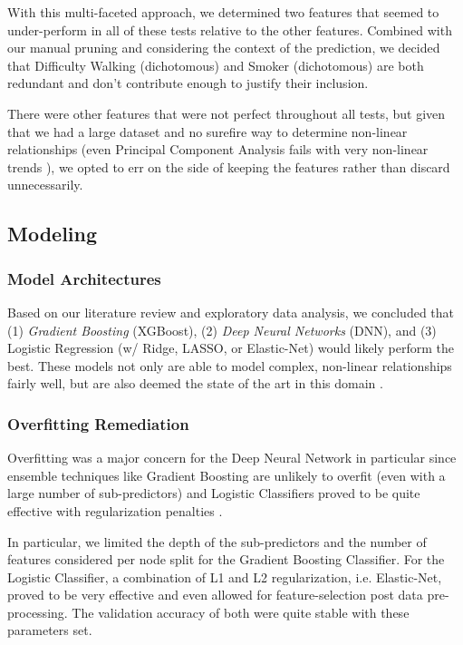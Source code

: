 \documentclass[conference]{IEEEtran}
\begin{document}
    With this multi-faceted approach, we determined two features that seemed to under-perform in all of these tests relative to the other features. Combined with our manual pruning and considering the context of the prediction, we decided that Difficulty Walking (dichotomous) and Smoker (dichotomous) are both redundant and don’t contribute enough to justify their inclusion.
    
    There were other features that were not perfect throughout all tests, but given that we had a large dataset and no surefire way to determine non-linear relationships (even Principal Component Analysis fails with very non-linear trends \cite{b5}), we opted to err on the side of keeping the features rather than discard unnecessarily.
    
    \subsection{Modeling}
        \subsubsection{Model Architectures}
        Based on our literature review and exploratory data analysis, we concluded that (1) \textit{Gradient Boosting} (XGBoost), (2) \textit{Deep Neural Networks} (DNN), and (3) Logistic Regression (w/ Ridge, LASSO, or Elastic-Net) would likely perform the best. These models not only are able to model complex, non-linear relationships fairly well, but are also deemed the state of the art in this domain \cite{b2}.

        \subsubsection{Overfitting Remediation}
        Overfitting was a major concern for the Deep Neural Network in particular since ensemble techniques like Gradient Boosting are unlikely to overfit (even with a large number of sub-predictors) and Logistic Classifiers proved to be quite effective with regularization penalties \cite{b7}.
        
        In particular, we limited the depth of the sub-predictors and the number of features considered per node split for the Gradient Boosting Classifier. For the Logistic Classifier, a combination of L1 and L2 regularization, i.e. Elastic-Net, proved to be very effective and even allowed for feature-selection post data pre-processing. The validation accuracy of both were quite stable with these parameters set.
\end{document}
